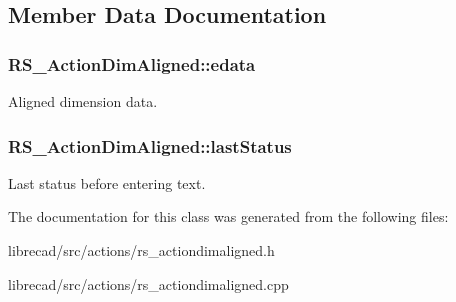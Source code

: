\subsection{Member Data Documentation}
\hypertarget{classRS__ActionDimAligned_aa8697d005721a4180a4dda9f1835260b}{
\subsubsection[{edata}]{ R\-S\-\_\-\-Action\-Dim\-Aligned\-::edata\hspace{0.3cm}{\ttfamily [protected]}}}\label{classRS__ActionDimAligned_aa8697d005721a4180a4dda9f1835260b}
Aligned dimension data. \hypertarget{classRS__ActionDimAligned_a1fdf882b21c984da35c3ffa0539fd064}{
\subsubsection[{last\-Status}]{ R\-S\-\_\-\-Action\-Dim\-Aligned\-::last\-Status\hspace{0.3cm}{\ttfamily [protected]}}}\label{classRS__ActionDimAligned_a1fdf882b21c984da35c3ffa0539fd064}
Last status before entering text. 

The documentation for this class was generated from the following files\-:\begin{DoxyCompactItemize}
\item 
librecad/src/actions/rs\-\_\-actiondimaligned.\-h\item 
librecad/src/actions/rs\-\_\-actiondimaligned.\-cpp\end{DoxyCompactItemize}
